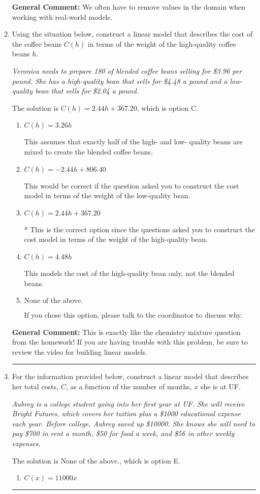 \documentclass{extbook}[14pt]
\newcommand{\litem}[1]{\item #1

\rule{\textwidth}{0.4pt}}
\begin{document}
\begin{enumerate}
{\textbf{General Comment:} We often have to remove values in the domain when working with real-world models.
}
\litem{
Using the situation below, construct a linear model that describes the cost of the coffee beans $C(h)$ in terms of the weight of the high-quality coffee beans $h$.

\begin{center}
    \textit{ Veronica needs to prepare 180 of blended coffee beans selling for \$3.96 per pound. She has a high-quality bean that sells for \$4.48 a pound and a low-quality bean that sells for \$2.04 a pound. }
\end{center}
The solution is \( C(h) = 2.44 h + 367.20 \), which is option C.\begin{enumerate}[label=\Alph*.]
\item \( C(h) = 3.26 h \)

This assumes that exactly half of the high- and low- quality beans are mixed to create the blended coffee beans.
\item \( C(h) = -2.44 h + 806.40 \)

This would be correct if the question asked you to construct the cost model in terms of the weight of the low-quality bean.
\item \( C(h) = 2.44 h + 367.20 \)

* This is the correct option since the questions asked you to construct the cost model in terms of the weight of the high-quality bean.
\item \( C(h) = 4.48 h \)

This models the cost of the high-quality bean only, not the blended beans.
\item \( \text{None of the above.} \)

If you chose this option, please talk to the coordinator to discuss why.
\end{enumerate}

\textbf{General Comment:} This is exactly like the chemistry mixture question from the homework! If you are having trouble with this problem, be sure to review the video for building linear models.
}
\litem{
For the information provided below, construct a linear model that describes her total costs, $C$, as a function of the number of months, $x$ she is at UF. 

\begin{center}
    \textit{ Aubrey is a college student going into her first year at UF. She will receive Bright Futures, which covers her tuition plus a \$1000 educational expense each year. Before college, Aubrey saved up \$10000. She knows she will need to pay \$700 in rent a month, \$50 for food a week, and \$56 in other weekly expenses. }
\end{center}
The solution is \( \text{None of the above.} \), which is option E.\begin{enumerate}[label=\Alph*.]
\item \( C(x) = 11000 x \)


\end{enumerate}}
\end{enumerate}
\end{document}
